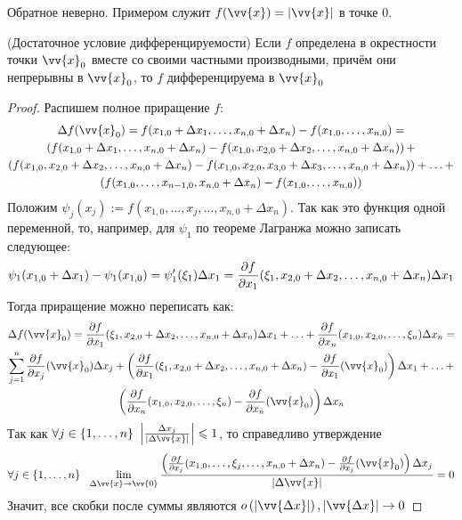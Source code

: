 \begin{example}
	Обратное неверно. Примером служит $f(\vv{x}) = |\vv{x}|$ в точке 0.
\end{example}

\begin{theorem} (Достаточное условие дифференцируемости)
	Если $f$ определена в окрестности точки $\vv{x}_0$ вместе со своими частными производными, причём они непрерывны в $\vv{x}_0$, то $f$ дифференцируема в $\vv{x}_0$
\end{theorem}

\begin{proof}
	Распишем полное приращение $f$:
	\begin{multline*}
		\Delta f(\vv{x}_0) = f(x_{1, 0} + \Delta x_1, \ldots, x_{n, 0} + \Delta x_n) - f(x_{1, 0}, \ldots, x_{n, 0}) =
		\\
		\left(f(x_{1, 0} + \Delta x_1, \ldots, x_{n, 0} + \Delta x_n) - f(x_{1, 0}, x_{2, 0} + \Delta x_2, \ldots, x_{n, 0} + \Delta x_n)\right) +
		\\
		\left(f(x_{1, 0}, x_{2, 0} + \Delta x_2, \ldots, x_{n, 0} + \Delta x_n) - f(x_{1, 0}, x_{2, 0}, x_{3, 0} + \Delta x_3, \ldots, x_{n, 0} + \Delta x_n)\right) + \ldots +
		\\
		\left(f(x_{1, 0}, \ldots, x_{n - 1, 0}, x_{n, 0} + \Delta x_n) - f(x_{1, 0}, \ldots, x_{n, 0})\right)
	\end{multline*}
	Положим $\psi_j(x_j) := f(x_{1, 0}, \ldots, x_j, \ldots, x_{n, 0} + \Delta x_n)$. Так как это функция одной переменной, то, например, для $\psi_1$ по теореме Лагранжа можно записать следующее:
	\[
		\psi_1(x_{1, 0} + \Delta x_1) - \psi_1(x_{1, 0}) = \psi'_1(\xi_1)\Delta x_1 = \frac{\partial f}{\partial x_1}(\xi_1, x_{2, 0} + \Delta x_2, \ldots, x_{n, 0} + \Delta x_n)\Delta x_1
	\]
	Тогда приращение можно переписать как:
	\begin{multline*}
		\Delta f(\vv{x}_0) = \pd{f}{x_1}(\xi_1, x_{2, 0} + \Delta x_2, \ldots, x_{n, 0} + \Delta x_n)\Delta x_1 + \ldots + \pd{f}{x_n}(x_{1, 0}, x_{2, 0}, \ldots, \xi_n)\Delta x_n =
		\\
		\suml_{j = 1}^n \pd{f}{x_j} (\vv{x}_0) \Delta x_j + \left(\pd{f}{x_1} (\xi_1, x_{2, 0} + \Delta x_2, \ldots, x_{n, 0} + \Delta x_n) - \pd{f}{x_1}(\vv{x}_0)\right)\Delta x_1 + \ldots +
		\\
		\left(\pd{f}{x_n} (x_{1, 0}, x_{2, 0}, \ldots, \xi_n) - \pd{f}{x_n} (\vv{x}_0)\right)\Delta x_n
	\end{multline*}
	Так как $\forall j \in \range{n}\ \left|\frac{\Delta x_j}{|\Delta \vv{x}|}\right| \leq 1$, то справедливо утверждение
	\[
		\forall j \in \range{n}\ \ \liml_{\Delta\vv{x} \to \vv{0}}\frac{\left(\frac{\vdelta f}{\vdelta x_j}(x_{1, 0}, \ldots, \xi_j, \ldots, x_{n, 0} + \Delta x_n) - \frac{\vdelta f}{\vdelta x_j}(\vv{x}_0)\right) \Delta x_j}{|\Delta \vv{x}|} = 0
	\]
	Значит, все скобки после суммы являются $o\left(|\vv{\Delta x}|\right), |\vv{\Delta x}| \to 0$
\end{proof}
